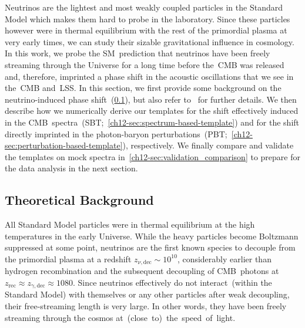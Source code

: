 Neutrinos are the lightest and most weakly coupled particles in the Standard Model which makes them hard to probe in the laboratory. Since these particles however were in thermal equilibrium with the rest of the primordial plasma at very early times, we can study their sizable gravitational influence in cosmology. In this work, we probe the SM~prediction that neutrinos have been freely streaming through the Universe for a long time before the~CMB was released and, therefore, imprinted a phase shift in the acoustic oscillations that we see in the~CMB and~LSS. In this section, we first provide some background on the neutrino-induced phase shift~(\textsection\ref{ch12-sec:background-theory}), but also refer to~\cite{Bashinsky:2003tk, Follin:2015hya, Baumann:2015rya, Wallisch:2018rzj} for further details. We then describe how we numerically derive our templates for the shift effectively induced in the CMB~spectra~(SBT;~\textsection\ref{ch12-sec:spectrum-based-template}) and for the shift directly imprinted in the photon-baryon perturbations~(PBT;~\textsection\ref{ch12-sec:perturbation-based-template}), respectively. We finally compare and validate the templates on mock spectra in~\textsection\ref{ch12-sec:validation_comparison} to prepare for the data analysis in the next section.


\subsection{Theoretical Background}
\label{ch12-sec:background-theory}

All Standard Model particles were in thermal equilibrium at the high temperatures in the early Universe. While the heavy particles become Boltzmann suppressed at some point, neutrinos are the first known species to decouple from the primordial plasma at a redshift $z_{\nu, \mathrm{dec}} \sim 10^{10}$, considerably earlier than hydrogen recombination and the subsequent decoupling of CMB~photons at $z_\mathrm{rec} \approx z_{\gamma, \mathrm{dec}} \approx 1080$. Since neutrinos effectively do not interact~(within the Standard Model) with themselves or any other particles after weak decoupling, their free-streaming length is very large. In other words, they have been freely streaming through the cosmos \mbox{at~(close to) the speed of light}.\medskip

